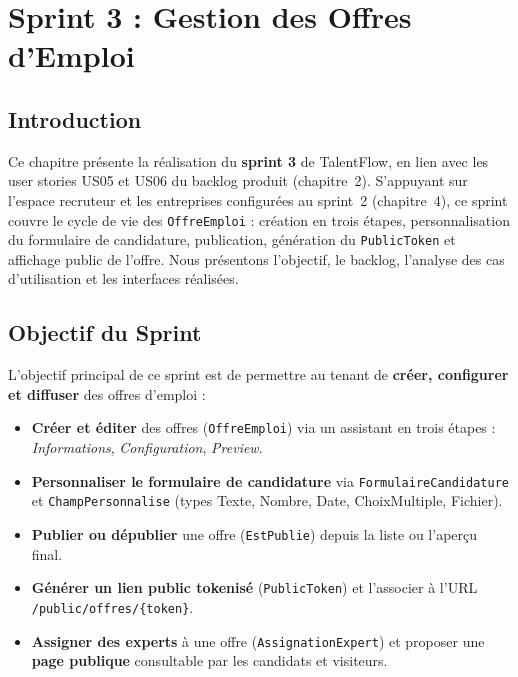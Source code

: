\chapter{Sprint 3 : Gestion des Offres d'Emploi}

\section*{Introduction}

Ce chapitre présente la réalisation du \textbf{sprint 3} de TalentFlow, en lien avec
les user stories US05 et US06 du backlog produit (chapitre~2). S'appuyant sur l'espace
recruteur et les entreprises configurées au sprint~2 (chapitre~4), ce sprint couvre
le cycle de vie des \texttt{OffreEmploi} : création en trois étapes, personnalisation
du formulaire de candidature, publication, génération du \texttt{PublicToken} et
affichage public de l'offre. Nous présentons l'objectif, le backlog, l'analyse des
cas d'utilisation et les interfaces réalisées.

\section{Objectif du Sprint}

L'objectif principal de ce sprint est de permettre au tenant de \textbf{créer, configurer
et diffuser} des offres d'emploi :

\begin{itemize}
    \item \textbf{Créer et éditer} des offres (\texttt{OffreEmploi}) via un assistant
    en trois étapes : \textit{Informations}, \textit{Configuration}, \textit{Preview}.

    \item \textbf{Personnaliser le formulaire de candidature} via
    \texttt{FormulaireCandidature} et \texttt{ChampPersonnalise} (types Texte, Nombre,
    Date, ChoixMultiple, Fichier).

    \item \textbf{Publier ou dépublier} une offre (\texttt{EstPublie}) depuis la liste
    ou l'aperçu final.

    \item \textbf{Générer un lien public tokenisé} (\texttt{PublicToken}) et l'associer
    à l'URL \texttt{/public/offres/\{token\}}.

    \item \textbf{Assigner des experts} à une offre (\texttt{AssignationExpert}) et
    proposer une \textbf{page publique} consultable par les candidats et visiteurs.
\end{itemize}

